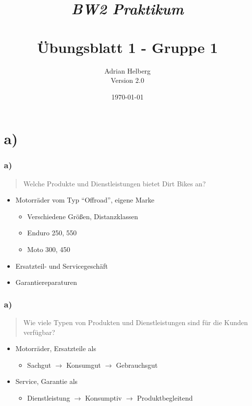 \documentclass{beamer}
\title{
	\textit{BW2 Praktikum} \\
	\textbf{\\ \"Ubungsblatt 1 - Gruppe 1}
}
\author{Adrian Helberg \\ Version 2.0}
\date{\today}
\begin{document}

\maketitle

\section{a)}
\begin{frame}
\frametitle{a)}

\begin{quote}
Welche Produkte und Dienstleistungen bietet Dirt Bikes an? 
\end{quote}

\begin{itemize}
\setlength{\itemsep}{20pt}
\item Motorr\"ader vom Typ ``Offroad'', eigene Marke
\begin{itemize}
\item Verschiedene Gr\"oßen, Distanzklassen
\item Enduro 250, 550
\item Moto 300, 450
\end{itemize}
\item Ersatzteil- und Servicegesch\"aft
\item Garantiereparaturen
\end{itemize}

\end{frame}

\begin{frame}
\frametitle{a)}

\begin{quote}
Wie viele Typen von Produkten und Dienstleistungen sind für die Kunden verfügbar?
\end{quote}

\begin{itemize}
\setlength{\itemsep}{12pt}
\item Motorräder, Ersatzteile als
\begin{itemize}
\item Sachgut $\rightarrow$ Konsumgut $\rightarrow$ Gebrauchsgut
\end{itemize}
\item Service, Garantie als
\begin{itemize}
\item Dienstleistung $\rightarrow$ Konsumptiv $\rightarrow$ Produktbegleitend
\end{itemize}
\end{itemize}

\end{frame}
\end{document}
